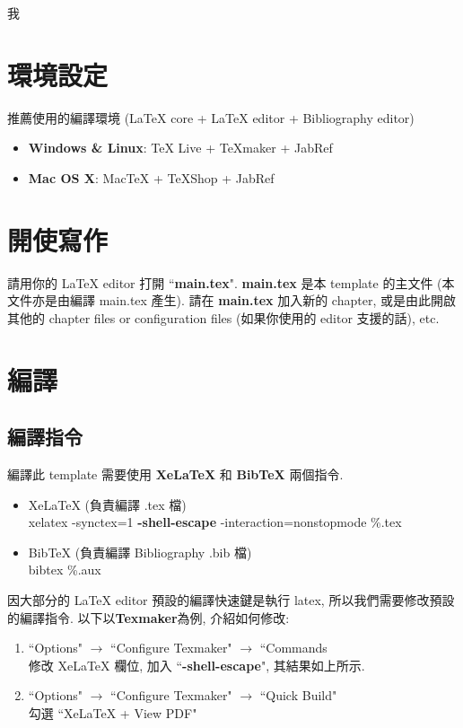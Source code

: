 我
\section{環境設定}

推薦使用的編譯環境 (LaTeX core + LaTeX editor + Bibliography editor)

\begin{itemize}
\item \textbf{Windows \& Linux}: TeX Live + TeXmaker + JabRef
\item \textbf{Mac OS X}: MacTeX + TeXShop + JabRef
\end{itemize}

\section{開使寫作}

請用你的 LaTeX editor 打開 ``\textbf{main.tex}".
\textbf{main.tex} 是本 template 的主文件 (本文件亦是由編譯 main.tex 產生).
請在 \textbf{main.tex} 加入新的 chapter, 或是由此開啟其他的 chapter files or configuration files (如果你使用的 editor 支援的話), etc.

\section{編譯}

\subsection{編譯指令}

編譯此 template 需要使用 \textbf{XeLaTeX} 和 \textbf{BibTeX} 兩個指令.

\begin{itemize}
\item XeLaTeX (負責編譯 .tex 檔)\\
xelatex -synctex=1 \textbf{-shell-escape} -interaction=nonstopmode \%.tex
\item BibTeX (負責編譯 Bibliography .bib 檔)\\
bibtex \%.aux
\end{itemize}

因大部分的 LaTeX editor 預設的編譯快速鍵是執行 latex, 所以我們需要修改預設的編譯指令.
以下以\textbf{Texmaker}為例, 介紹如何修改:
\begin{enumerate}
\item ``Options" $\rightarrow$ ``Configure Texmaker" $\rightarrow$ ``Commands\\
修改 XeLaTeX 欄位, 加入 ``\textbf{-shell-escape}", 其結果如上所示.
\item ``Options" $\rightarrow$ ``Configure Texmaker" $\rightarrow$ ``Quick Build"\\
勾選 ``XeLaTeX + View PDF"

\end{enumerate}

